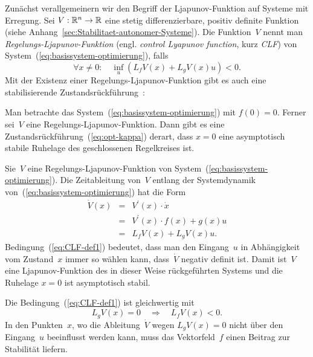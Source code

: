 Zunächst verallgemeinern wir den Begriff der Ljapunov-Funktion auf
Systeme mit Erregung. Sei $V:{\mathbb{R}}^{n}\to{\mathbb{R}}$ eine stetig differenzierbare,
positiv definite Funktion (siehe Anhang~\ref{sec:Stabilitaet-autonomer-Systeme}).
Die Funktion~$V$ nennt man \emph{Regelungs-Ljapunov-Funktion}
(engl. \emph{control Lyapunov function}, kurz \emph{CLF}) von System~(\ref{eq:basissystem-optimierung}),
falls
\begin{equation}
\forall x\neq0:\quad\inf_{u}\left(L_{f}V(x)+L_{g}V(x)u\right)<0.\label{eq:CLF-def1}
\end{equation}
Mit der Existenz einer Regelungs-Ljapunov-Funktion gibt es auch eine
stabilisierende Zustandsrückführung~\cite{artstein1983}:
\begin{theorem}
\label{thm:Artstein}Man betrachte das System~(\ref{eq:basissystem-optimierung})
mit $f(0)=0$. Ferner sei~$V$ eine Regelungs-Ljapunov-Funktion.
Dann gibt es eine Zustandsrückführung~(\ref{eq:opt-kappa}) derart,
dass $x=0$ eine asymptotisch stabile Ruhelage des geschlossenen Regelkreises
ist.
\end{theorem}
\begin{proofsketch}Sie~$V$ eine Regelungs-Ljapunov-Funktion von
System~(\ref{eq:basissystem-optimierung}). Die Zeitableitung von~$V$
entlang der Systemdynamik von~(\ref{eq:basissystem-optimierung})
hat die Form
\begin{equation}
\begin{array}{ccl}
\dot{V}(x) & = & V^{\prime}(x)\cdot\dot{x}\\
 & = & V^{\prime}(x)\cdot f(x)+g(x)u\\
 & = & L_{f}V(x)+L_{g}V(x)u.
\end{array}\label{eq:opt-Vdot1}
\end{equation}
Bedingung~(\ref{eq:CLF-def1}) bedeutet, dass man den Eingang~$u$
in Abhängigkeit vom Zustand~$x$ immer so wählen kann, dass~$\dot{V}$
negativ definit ist. Damit ist~$V$ eine Ljapunov-Funktion des in
dieser Weise rückgeführten Systems und die Ruhelage $x=0$ ist asymptotisch
stabil.\end{proofsketch}

Die Bedingung~(\ref{eq:CLF-def1}) ist gleichwertig mit 
\begin{equation}
L_{g}V(x)=0\quad\Longrightarrow\quad L_{f}V(x)<0.\label{eq:CLF-def2}
\end{equation}
In den Punkten~$x$, wo die Ableitung~$\dot{V}$ wegen $L_{g}V(x)=0$
nicht über den Eingang~$u$ beeinflusst werden kann, muss das Vektorfeld~$f$
einen Beitrag zur Stabilität liefern.

